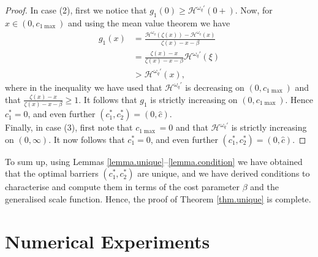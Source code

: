 \documentclass[10pt,a4paper]{amsart}
\newcommand{\cH}{\mathcal{H}}
\newcommand{\homega}{\omega_q}
\renewcommand{\geq}{\geqslant}
\begin{document}
\begin{proof}
	In case (2), first we notice that $g_1(0) \geq \cH^{\homega\prime}(0+)$. Now, for $x \in (0,c_{1\max})$ and using the mean value theorem we have
	\begin{align*}
		g_1(x) &= \frac{\cH^{\homega}(\zeta(x)) - \cH^{\homega}(x)}{\zeta(x) - x -\beta}\\
		&=\frac{\zeta(x) - x}{\zeta(x) - x -\beta}\cH^{\homega\prime}(\xi)\\
		&> \cH^{\homega\prime}(x),
	\end{align*}
	where in the inequality we have used that $\cH^{\homega\prime}$ is decreasing on $(0,c_{1\max})$ and that $\frac{\zeta(x) - x}{\zeta(x) - x -\beta} \geq 1$. It follows that $g_1$ is strictly increasing on $(0,c_{1\max})$. Hence $c_1^{\ast} = 0$, and even further $(c_1^\ast,c_2^\ast) = (0,\hat{c})$.\\
	Finally, in case (3), first note that $c_{1\max} = 0$ and that $\cH^{\homega\prime}$ is strictly increasing on $(0,\infty)$. It now follows that  $c_1^{\ast} = 0$, and even further $(c_1^\ast,c_2^\ast) = (0,\hat{c})$.
\end{proof}
To sum up, using Lemmas \eqref{lemma.unique}--\eqref{lemma.condition} we have obtained that the optimal barriers $(c_1^\ast,c_2^\ast)$ are unique, and we have derived conditions to characterise and compute them in terms of the cost parameter $\beta$ and the generalised scale function. Hence, the proof of Theorem \ref{thm.unique} is complete.

\section{Numerical Experiments}\label{Sec:Numerical}
\end{document}
